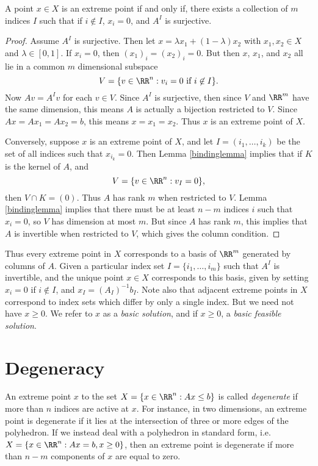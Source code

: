 \begin{lemma}
    A point $x \in X$ is an extreme point if and only if, there exists a collection of $m$ indices $I$ such that if $i \not \in I$, $x_i = 0$, and $A^I$ is surjective.
\end{lemma}

\begin{proof}
    Assume $A^I$ is surjective. Then let $x = \lambda x_1 + (1 - \lambda)x_2$ with $x_1,x_2 \in X$ and $\lambda \in [0,1]$. If $x_i = 0$, then $(x_1)_i = (x_2)_i = 0$. But then $x$, $x_1$, and $x_2$ all lie in a common $m$ dimensional subspace
    \[ V = \{ v \in \RR^n: v_i = 0\ \text{if}\ i \not \in I \}. \]
    Now $Av = A^Iv$ for each $v \in V$. Since $A^I$ is surjective, then since $V$ and $\RR^m$ have the same dimension, this means $A$ is actually a bijection restricted to $V$. Since $A x = A x_1 = A x_2 = b$, this means $x = x_1 = x_2$. Thus $x$ is an extreme point of $X$.

    Conversely, suppose $x$ is an extreme point of $X$, and let $I = (i_1, \dots, i_k)$ be the set of all indices such that $x_{i_k} = 0$. Then Lemma \ref{bindinglemma} implies that if $K$ is the kernel of $A$, and
    \[ V = \{ v \in \RR^n : v_I = 0 \}, \]
    then $V \cap K = (0)$. Thus $A$ has rank $m$ when restricted to $V$. Lemma \ref{bindinglemma} implies that there must be at least $n - m$ indices $i$ such that $x_i = 0$, so $V$ has dimension at most $m$. But since $A$ has rank $m$, this implies that $A$ is invertible when restricted to $V$, which gives the column condition.
\end{proof}

Thus every extreme point in $X$ corresponds to a basis of $\RR^m$ generated by columns of $A$. Given a particular index set $I = \{ i_1, \dots, i_m \}$ such that $A^I$ is invertible, and the unique point $x \in X$ corresponds to this basis, given by setting $x_i = 0$ if $i \not \in I$, and $x_I = (A_I)^{-1}b_I$. Note also that adjacent extreme points in $X$ correspond to index sets which differ by only a single index. But we need not have $x \geq 0$. We refer to $x$ as a \emph{basic solution}, and if $x \geq 0$, a \emph{basic feasible solution}.

\section{Degeneracy}

An extreme point $x$ to the set $X = \{ x \in \RR^n: Ax \leq b \}$ is called \emph{degenerate} if more than $n$ indices are active at $x$. For instance, in two dimensions, an extreme point is degenerate if it lies at the intersection of three or more edges of the polyhedron. If we instead deal with a polyhedron in standard form, i.e. $X = \{ x \in \RR^n: Ax = b, x \geq 0 \}$, then an extreme point is degenerate if more than $n - m$ components of $x$ are equal to zero.


